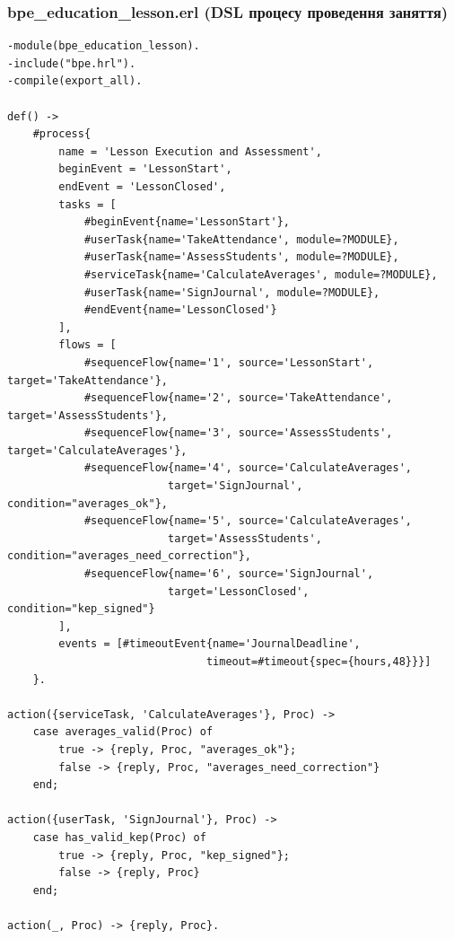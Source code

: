 \documentclass{article}
\begin{document}
\subsubsection{bpe\_education\_lesson.erl (DSL процесу проведення заняття)}
\begin{verbatim}
-module(bpe_education_lesson).
-include("bpe.hrl").
-compile(export_all).

def() ->
    #process{
        name = 'Lesson Execution and Assessment',
        beginEvent = 'LessonStart',
        endEvent = 'LessonClosed',
        tasks = [
            #beginEvent{name='LessonStart'},
            #userTask{name='TakeAttendance', module=?MODULE},
            #userTask{name='AssessStudents', module=?MODULE},
            #serviceTask{name='CalculateAverages', module=?MODULE},
            #userTask{name='SignJournal', module=?MODULE},
            #endEvent{name='LessonClosed'}
        ],
        flows = [
            #sequenceFlow{name='1', source='LessonStart', target='TakeAttendance'},
            #sequenceFlow{name='2', source='TakeAttendance', target='AssessStudents'},
            #sequenceFlow{name='3', source='AssessStudents', target='CalculateAverages'},
            #sequenceFlow{name='4', source='CalculateAverages', 
                         target='SignJournal', condition="averages_ok"},
            #sequenceFlow{name='5', source='CalculateAverages', 
                         target='AssessStudents', condition="averages_need_correction"},
            #sequenceFlow{name='6', source='SignJournal', 
                         target='LessonClosed', condition="kep_signed"}
        ],
        events = [#timeoutEvent{name='JournalDeadline', 
                               timeout=#timeout{spec={hours,48}}}]
    }.

action({serviceTask, 'CalculateAverages'}, Proc) ->
    case averages_valid(Proc) of
        true -> {reply, Proc, "averages_ok"};
        false -> {reply, Proc, "averages_need_correction"}
    end;

action({userTask, 'SignJournal'}, Proc) ->
    case has_valid_kep(Proc) of
        true -> {reply, Proc, "kep_signed"};
        false -> {reply, Proc}
    end;

action(_, Proc) -> {reply, Proc}.
\end{verbatim}
\end{document}
